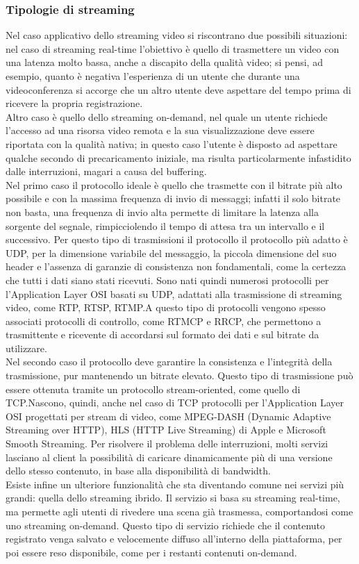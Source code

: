 		\subsubsection{Tipologie di streaming}
			Nel caso applicativo dello streaming video si riscontrano due possibili situazioni:
			nel caso di streaming real-time l'obiettivo è quello di trasmettere un video con una latenza molto bassa, anche a discapito della qualità video; si pensi, ad esempio, quanto è negativa l'esperienza di un utente che durante una videoconferenza si accorge che un altro utente deve aspettare del tempo prima di ricevere la propria registrazione.
			\\
			Altro caso è quello dello streaming on-demand, nel quale un utente richiede l'accesso ad una risorsa video remota e la sua visualizzazione deve essere riportata con la qualità nativa; in questo caso l'utente è disposto ad aspettare qualche secondo di precaricamento iniziale, ma risulta particolarmente infastidito dalle interruzioni, magari a causa del buffering.
			\\
			Nel primo caso il protocollo ideale è quello che trasmette con il bitrate più alto possibile e con la massima frequenza di invio di messaggi; infatti il solo bitrate non basta, una frequenza di invio alta permette di limitare la latenza alla sorgente del segnale, rimpicciolendo il tempo di attesa tra un intervallo e il successivo. Per questo tipo di trasmissioni il protocollo il protocollo più adatto è UDP, per la dimensione variabile del messaggio, la piccola dimensione del suo header e l'assenza di garanzie di consistenza non fondamentali, come la certezza che tutti i dati siano stati ricevuti. Sono nati quindi numerosi protocolli per l'Application Layer OSI basati su UDP, adattati alla trasmissione di streaming video, come RTP, RTSP, RTMP.\@ A questo tipo di protocolli vengono spesso associati protocolli di controllo, come RTMCP e RRCP, che permettono a trasmittente e ricevente di accordarsi sul formato dei dati e sul bitrate da utilizzare.
			\\
			Nel secondo caso il protocollo deve garantire la consistenza e l'integrità della trasmissione, pur mantenendo un bitrate elevato. Questo tipo di trasmissione può essere ottenuta tramite un protocollo stream-oriented, come quello di TCP.\@ Nascono, quindi, anche nel caso di TCP protocolli per l'Application Layer OSI progettati per stream di video, come MPEG-DASH (Dynamic Adaptive Streaming over HTTP), HLS (HTTP Live Streaming) di Apple e Microsoft Smooth Streaming. Per risolvere il problema delle interruzioni, molti servizi lasciano al client la possibilità di caricare dinamicamente più di una versione dello stesso contenuto, in base alla disponibilità di bandwidth.
			\\
			Esiste infine un ulteriore funzionalità che sta diventando comune nei servizi più grandi: quella dello streaming ibrido. Il servizio si basa su streaming real-time, ma permette agli utenti di rivedere una scena già trasmessa, comportandosi come uno streaming on-demand. Questo tipo di servizio richiede che il contenuto registrato venga salvato e velocemente diffuso all'interno della piattaforma, per poi essere reso disponibile, come per i restanti contenuti on-demand.

